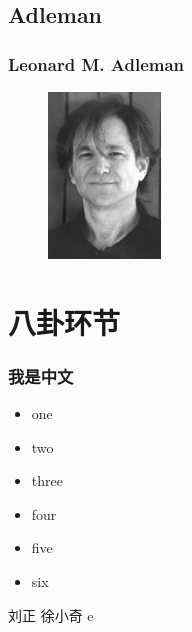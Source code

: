 \documentclass[slidestop,compress,mathserif]{beamer}
\begin{document}
\subsection{\hfill Adleman}
\begin{frame}
  \frametitle{Leonard M. Adleman}
  \begin{multicols}{2}
    \begin{figure}
      \includegraphics[width=3cm]{Adleman.jpg}
    \end{figure}
    
  \end{multicols}

\end{frame}





\section{八卦环节}









\begin{frame}
\frametitle{我是中文} 
\begin{itemize}[<+->]
\item one
\item two
\item three
\item four
\item five
\item six
\end{itemize}

刘正 徐小奇 e
\end{frame}
\end{document}
